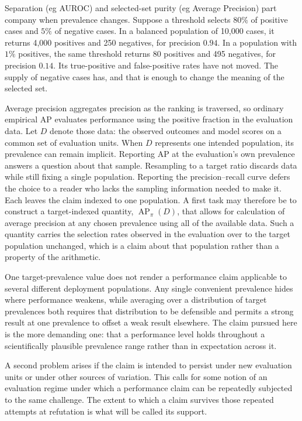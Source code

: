 \documentclass[11pt]{article}
\newcommand{\AP}{\operatorname{AP}}
\theoremstyle{remark}
\begin{document}
Separation (eg AUROC) and selected-set purity (eg Average Precision) part company when prevalence changes.
Suppose a threshold selects $80\%$ of positive cases and $5\%$ of negative
cases. In a balanced population of 10,000 cases, it returns 4,000 positives and
250 negatives, for precision $0.94$. In a population with $1\%$ positives, the
same threshold returns 80 positives and 495 negatives, for precision $0.14$.
Its true-positive and false-positive rates have not moved. The supply of
negative cases has, and that is enough to change the meaning of the selected
set.

Average precision aggregates precision as the ranking is traversed, so ordinary
empirical AP evaluates performance using the positive fraction in the
evaluation data. Let $D$ denote those data: the observed outcomes and model
scores on a common set of evaluation units. When $D$ represents one intended
population, its prevalence can remain implicit. Reporting AP at the
evaluation's own prevalence answers a question about that sample. Resampling to
a target ratio discards data while still fixing a single population. Reporting
the precision--recall curve defers the choice to a reader who lacks the
sampling information needed to make it. Each leaves the claim indexed to one
population. A first task may therefore be to construct a target-indexed
quantity, $\AP_\pi(D)$, that allows for calculation of average precision at any
chosen prevalence using all of the available data. Such a quantity carries the
selection rates observed in the evaluation over to the target population
unchanged, which is a claim about that population rather than a property of the
arithmetic.

One target-prevalence value does not render a performance claim applicable to
several different deployment populations. Any single convenient prevalence
hides where performance weakens, while averaging over a distribution of target
prevalences both requires that distribution to be defensible and permits a
strong result at one prevalence to offset a weak result elsewhere. The claim
pursued here is the more demanding one: that a performance level holds
throughout a scientifically plausible prevalence range rather than in
expectation across it.

A second problem arises if the claim is intended to persist under new
evaluation units or under other sources of variation. This calls for some
notion of an evaluation regime under which a performance claim can be
repeatedly subjected to the same challenge. The extent to which a claim
survives those repeated attempts at refutation is what will be called its
support.
\end{document}
